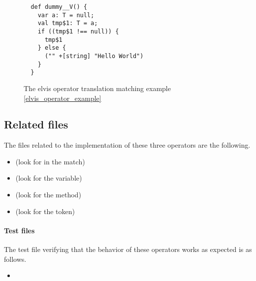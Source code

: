 \begin{figure}[H]
  \begin{verbatim}
  def dummy__V() {
    var a: T = null;
    val tmp$1: T = a;
    if ((tmp$1 !== null)) {
      tmp$1
    } else {
      ("" +[string] "Hello World")
    }
  }
  \end{verbatim}
  \caption{The elvis operator translation matching example \ref{elvis_operator_example}}
  \label{elvis_operator_example_ir}
\end{figure}


\subsection{Related files} The files related to the implementation of these three operators are the 
following.

\begin{itemize}
 \item {} (look for  in the 
match)
 \item {} (look for the  variable)
 \item {} (look for the  method)
 \item {} (look for the  token)
\end{itemize}

\paragraph{Test files} The test file verifying that the behavior of these operators works as 
expected is as follows.

\begin{itemize}
 \item {}
\end{itemize}